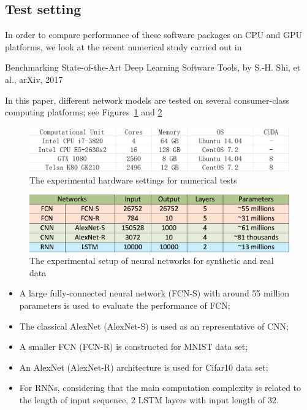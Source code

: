 \documentclass[11pt, oneside]{article}   	%
\begin{document}
\subsection{Test setting}

In order to compare performance of these software packages on CPU and GPU platforms, we look at the recent numerical study carried out in
\begin{center}
{\color{red}
Benchmarking State-of-the-Art Deep Learning Software Tools, by S.-H. Shi, et al., arXiv, 2017}
\end{center}
In this paper, different network models are tested on several consumer-class computing platforms; see Figures~\ref{fig:hardware} and \ref{fig:model}

\begin{figure}[htbp]\centering
	\includegraphics[width=\linewidth]{figures/platforms.png} 
	\caption{The experimental hardware settings for numerical tests}\label{fig:hardware}
\end{figure}
%
\begin{figure}[htbp]\centering
\includegraphics[width=\linewidth]{figures/models.png} 
\caption{The experimental setup of neural networks for synthetic and real data}\label{fig:model}
\end{figure}
	

\begin{itemize}

\item A large fully-connected neural network ({FCN-S}) with around 55 million parameters is used to evaluate the performance of FCN;

\item The classical AlexNet ({AlexNet-S}) is used as an representative of CNN;

\item A smaller FCN ({FCN-R}) is constructed for MNIST data set;

\item An AlexNet ({AlexNet-R}) architecture is used for Cifar10 data set;

\item For RNNs, considering that the main computation complexity is related to the length of input sequence, 2 LSTM layers with input length of 32.

\end{itemize}
	
\end{document}
